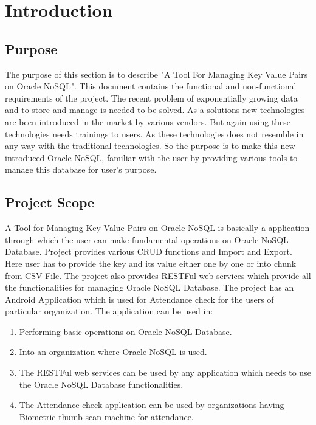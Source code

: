 \section{Introduction}
\subsection{Purpose}
\hspace*{0.7in} The purpose of this section is to describe "A Tool For Managing Key Value Pairs on Oracle NoSQL". This document contains the functional and non-functional requirements of the project. The recent problem of exponentially growing data and to store and manage is needed to be solved. As a solutions new technologies are been introduced in the market by various vendors. But again using these technologies needs trainings to users. As these technologies does not resemble in any way with the traditional technologies. So the purpose is to make this new introduced Oracle NoSQL, familiar with the user by providing various tools to manage this database for user's purpose.

\subsection{Project Scope}
\hspace*{0.7in} A Tool for Managing Key Value Pairs on Oracle NoSQL is basically a application through which the user can make fundamental operations on Oracle NoSQL Database. Project provides various CRUD functions and Import and Export. Here user has to provide the key and its value either one by one or into chunk from CSV File. The project also provides RESTFul web services which provide all the functionalities for managing Oracle NoSQL Database. The project has an Android Application which is used for Attendance check for the users of particular organization. The application can be used in:
\begin{enumerate}
  \item Performing basic operations on Oracle NoSQL Database.
  \item Into an organization where Oracle NoSQL is used.
  \item The RESTFul web services can be used by any application which needs to use the Oracle NoSQL Database functionalities.
  \item The Attendance check application can be used by organizations having Biometric thumb scan machine for attendance.
\end{enumerate}

